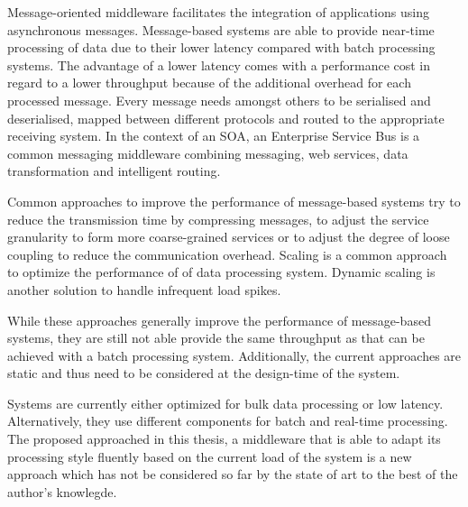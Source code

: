Message-oriented middleware facilitates the integration of applications using asynchronous messages. Message-based systems are able to provide near-time processing of data due to their lower latency compared with batch processing systems. The advantage of a lower latency comes with a performance cost in regard to a lower throughput because of the additional overhead for each processed message. Every message needs amongst others to be serialised and deserialised, mapped between different protocols and routed to the appropriate receiving system. In the context of an \ac{SOA}, an Enterprise Service Bus is a common messaging middleware combining messaging, web services, data transformation and intelligent routing.

Common approaches to improve the performance of message-based systems try to reduce the transmission time by compressing messages, to adjust the service granularity to form more coarse-grained services or to adjust the degree of loose coupling to reduce the communication overhead. Scaling is a common approach to optimize the performance of of data processing system. Dynamic scaling is another solution to handle infrequent load spikes.

While these approaches generally improve the performance of mes\-sage-based systems, they are still not able provide the same throughput as that can be achieved with a batch processing system. Additionally, the current approaches are static and thus need to be considered at the design-time of the system. 

Systems are currently either optimized for bulk data processing or low latency. Alternatively, they use different components for batch and real-time processing. The proposed approached in this thesis, a middleware that is able to adapt its processing style fluently based on the current load of the system is a new approach which has not be considered so far by the state of art to the best of the author's knowlegde.
